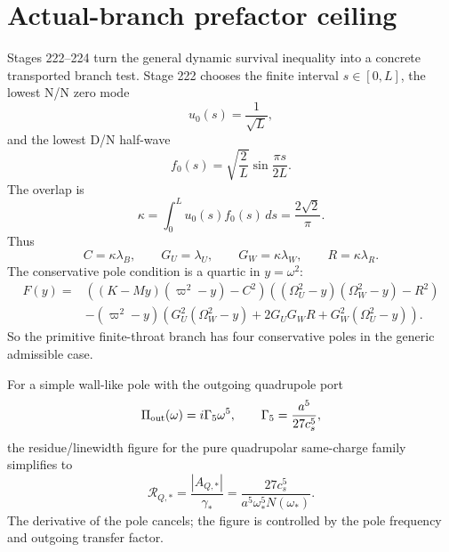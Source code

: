
\section{Actual-branch prefactor ceiling}
\label{sec:part07_same_charge_rigid_mouth:actual-branch-prefactor-ceiling}

Stages 222--224 turn the general dynamic survival inequality into a concrete transported branch test.  Stage 222 chooses the finite interval \(s\in[0,L]\), the lowest N/N zero mode
\begin{equation}
\label{eq:part07-nn-zero-mode}
u_0(s)=\frac1{\sqrt L},
\end{equation}
and the lowest D/N half-wave
\begin{equation}
\label{eq:part07-dn-half-wave}
f_0(s)=\sqrt{\frac2L}\sin\frac{\pi s}{2L}.
\end{equation}
The overlap is
\begin{equation}
\label{eq:part07-primitive-kappa}
\kappa=\int_0^Lu_0(s)f_0(s)\,ds=\frac{2\sqrt2}{\pi}.
\end{equation}
Thus
\begin{equation}
\label{eq:part07-primitive-couplings}
C=\kappa\lambda_B,
\qquad
G_U=\lambda_U,
\qquad
G_W=\kappa\lambda_W,
\qquad
R=\kappa\lambda_R.
\end{equation}
The conservative pole condition is a quartic in \(y=\omega^2\):
\begin{equation}
\label{eq:part07-quartic-pole}
\begin{aligned}
F(y)=&\left((K-My)(\varpi^2-y)-C^2\right)
\left((\Omega_U^2-y)(\Omega_W^2-y)-R^2\right)\\
&-(\varpi^2-y)
\left(G_U^2(\Omega_W^2-y)+2G_UG_WR+G_W^2(\Omega_U^2-y)\right).
\end{aligned}
\end{equation}
So the primitive finite-throat branch has four conservative poles in the generic admissible case.

For a simple wall-like pole with the outgoing quadrupole port
\begin{equation}
\label{eq:part07-outgoing-gamma5}
\Pi_{\rm out}(\omega)=i\Gamma_5\omega^5,
\qquad
\Gamma_5=\frac{a^5}{27c_s^5},
\end{equation}
the residue/linewidth figure for the pure quadrupolar same-charge family simplifies to
\begin{equation}
\label{eq:part07-residue-linewidth-primitive}
\mathcal R_{Q,*}
=
\frac{|A_{Q,*}|}{\gamma_*}
=
\frac{27c_s^5}{a^5\omega_*^5N(\omega_*)}.
\end{equation}
The derivative of the pole cancels; the figure is controlled by the pole frequency and outgoing transfer factor.

